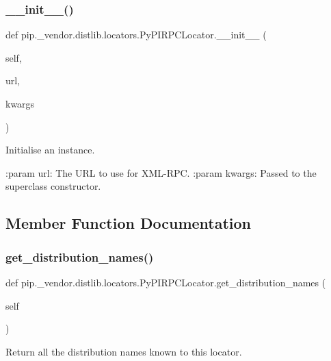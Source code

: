 \subsubsection{\texorpdfstring{\+\_\+\+\_\+init\+\_\+\+\_\+()}{\_\_init\_\_()}}
{\footnotesize\ttfamily def pip.\+\_\+vendor.\+distlib.\+locators.\+Py\+P\+I\+R\+P\+C\+Locator.\+\_\+\+\_\+init\+\_\+\+\_\+ (\begin{DoxyParamCaption}\item[{}]{self,  }\item[{}]{url,  }\item[{}]{kwargs }\end{DoxyParamCaption})}

\begin{DoxyVerb}Initialise an instance.

:param url: The URL to use for XML-RPC.
:param kwargs: Passed to the superclass constructor.
\end{DoxyVerb}
 

\subsection{Member Function Documentation}
\mbox{\label{classpip_1_1__vendor_1_1distlib_1_1locators_1_1PyPIRPCLocator_af4dff2cf7d93a6edbad60de3022b5727}} 
\subsubsection{\texorpdfstring{get\+\_\+distribution\+\_\+names()}{get\_distribution\_names()}}
{\footnotesize\ttfamily def pip.\+\_\+vendor.\+distlib.\+locators.\+Py\+P\+I\+R\+P\+C\+Locator.\+get\+\_\+distribution\+\_\+names (\begin{DoxyParamCaption}\item[{}]{self }\end{DoxyParamCaption})}

\begin{DoxyVerb}Return all the distribution names known to this locator.
\end{DoxyVerb}
 

